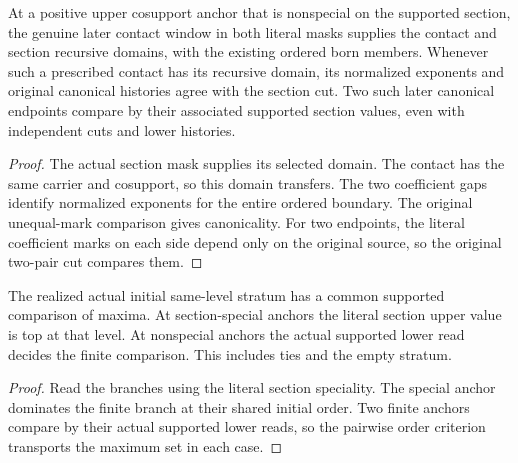 \begin{theorem}
\label{hir:g1-later-contact-recursive-domain}
\leanok
At a positive upper cosupport anchor that is nonspecial on the
supported section, the genuine later contact window in both
literal masks supplies the contact and section recursive
domains, with the existing ordered born members. Whenever
such a prescribed contact has its recursive domain, its
normalized exponents and original canonical histories agree
with the section cut. Two such later canonical endpoints
compare by their associated supported section values, even
with independent cuts and lower histories.
\end{theorem}
\begin{proof}
The actual section mask supplies its selected domain. The
contact has the same carrier and cosupport, so this domain
transfers. The two coefficient gaps identify normalized
exponents for the entire ordered boundary. The original
unequal-mark comparison gives canonicality. For two endpoints,
the literal coefficient marks on each side depend only on the
original source, so the original two-pair cut compares them.
\end{proof}

\begin{theorem}
\label{hir:g1-initial-positive-all-stratum}
\leanok
The realized actual initial same-level stratum has a common
supported comparison of maxima. At section-special anchors the
literal section upper value is top at that level. At nonspecial
anchors the actual supported lower read decides the finite
comparison. This includes ties and the empty stratum.
\end{theorem}
\begin{proof}
Read the branches using the literal section speciality. The
special anchor dominates the finite branch at their shared
initial order. Two finite anchors compare by their actual
supported lower reads, so the pairwise order criterion
transports the maximum set in each case.
\end{proof}

